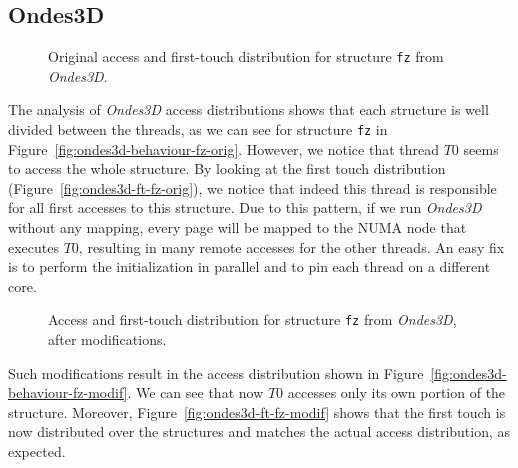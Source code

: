 \subsection{Ondes3D}
\label{sec:exp-ondes3d}

\begin{figure}[!t]
    \centering

    \caption{Original access and first-touch distribution for structure
        \texttt{fz} from \emph{Ondes3D}.}
    \label{fig:ondes3d-orig}
\end{figure}

The analysis of \emph{Ondes3D} access distributions shows that each
structure is well divided between the threads, as we can see for structure \texttt{fz} in Figure~\ref{fig:ondes3d-behaviour-fz-orig}.
However, we notice that thread $T0$ seems to access the whole structure. By looking at the first touch distribution (Figure~\ref{fig:ondes3d-ft-fz-orig}), we
notice that indeed this thread is responsible for all first accesses to this structure. Due to
this pattern, if we run \emph{Ondes3D} without any mapping, every page
will be mapped to the NUMA node that executes $T0$, resulting in many remote accesses for the other threads. An easy fix is to
perform the initialization in parallel and to pin each thread on a different core.

\begin{figure}[!t]
    \centering

    \caption{Access and first-touch distribution  for structure
        \texttt{fz} from \emph{Ondes3D}, after modifications.}
    \label{fig:ondes3d-modif}
\end{figure}

Such modifications result in the access distribution shown in Figure~\ref{fig:ondes3d-behaviour-fz-modif}. We can see that now $T0$ accesses only
its own portion of the structure. Moreover, Figure~\ref{fig:ondes3d-ft-fz-modif} shows that the first touch is now distributed
over the structures and matches the actual access distribution, as expected.

